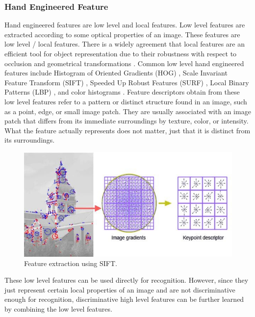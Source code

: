\subsubsection{Hand Engineered Feature}
Hand engineered features are low level and local features.
Low level features are extracted according to some optical properties of an image. These features are low level / local features. There is a widely agreement that local features are an efficient tool for object representation due to their robustness with respect to occlusion and geometrical transformations \cite{van2006coloring}. Common low level hand engineered features include Histogram of Oriented Gradients (HOG) \cite{dalal2005histograms}, Scale Invariant Feature Transform (SIFT) \cite{lowe1999object}, Speeded Up Robust Features (SURF) \cite{bay2006surf}, Local Binary Patterns (LBP) \cite{ojala2002multiresolution}, and color histograms \cite{birchfield1998elliptical}. Feature descriptors obtain from these low level features refer to a pattern or distinct structure found in an image, such as a point, edge, or small image patch. They are usually associated with an image patch that differs from its immediate surroundings by texture, color, or intensity. What the feature actually represents does not matter, just that it is distinct from its surroundings.
\begin{figure}[h]
	\centering
	\includegraphics[scale=.6]{introduction/fig/sift.jpg}
	\caption{Feature extraction using SIFT.}\label{fig:intro:sift}
\end{figure}
These low level features can be used directly for recognition. However, since they just represent certain local properties of an image and are not discriminative enough for recognition, discriminative high level features can be further learned by combining the low level features. 

